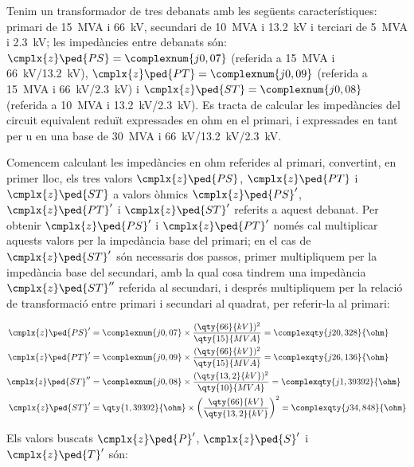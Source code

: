 	
\begin{exemple}[\ImpCircEqTrafoTresDeb{}]
	\addcontentsxms{\ImpCircEqTrafoTresDeb}
    Tenim un transformador de tres debanats amb les següents característiques: primari de \qty{15}{MVA} i \qty{66}{kV}, secundari de \qty{10}{MVA} i \qty{13,2}{kV} i terciari de \qty{5}{MVA} i \qty{2,3}{kV}; les impedàncies entre debanats són: $\cmplx{z}\ped{PS} = \complexnum{j 0,07}$ (referida a \qty{15}{MVA} i \qty{66}{kV}/\qty{13,2}{kV}), $\cmplx{z}\ped{PT} = \complexnum{j 0,09}$ (referida a \qty{15}{MVA} i \qty{66}{kV}/\qty{2,3}{kV}) i $\cmplx{z}\ped{ST} = \complexnum{j 0,08}$ (referida a \qty{10}{MVA} i \qty{13,2}{kV}/\qty{2,3}{kV}).  Es tracta de calcular les impedàncies del circuit equivalent reduït expressades en ohm en el primari, i expressades en tant per u en una base de \qty{30}{MVA} i \qty{66}{kV}/\qty{13,2}{kV}/\qty{2,3}{kV}.

    Comencem calculant les impedàncies en ohm referides al primari, convertint, en primer lloc, els tres valors $\cmplx{z}\ped{PS}$, $\cmplx{z}\ped{PT}$ i $\cmplx{z}\ped{ST}$ a valors òhmics $\cmplx{z}\ped{PS}'$, $\cmplx{z}\ped{PT}'$ i $\cmplx{z}\ped{ST}'$ referits a aquest debanat. Per obtenir $\cmplx{z}\ped{PS}'$ i $\cmplx{z}\ped{PT}'$ només cal multiplicar aquests valors per la impedància base del primari; en el cas de $\cmplx{z}\ped{ST}'$ són necessaris dos passos, primer multipliquem per la impedància base del secundari, amb la qual cosa tindrem una impedància $\cmplx{z}\ped{ST}''$ referida al secundari,  i després multipliquem per la relació de transformació entre primari i secundari al quadrat, per  referir-la al primari:

    \begin{align*}
        \cmplx{z}\ped{PS}' &=  \complexnum{j 0,07} \times \frac{(\qty{66}{kV})^2}{\qty{15}{MVA}} = \complexqty{j 20,328}{\ohm}\\
        \cmplx{z}\ped{PT}' &=  \complexnum{j 0,09} \times \frac{(\qty{66}{kV})^2}{\qty{15}{MVA}} = \complexqty{j 26,136}{\ohm}\\
        \cmplx{z}\ped{ST}'' &= \complexnum{j 0,08} \times \frac{(\qty{13,2}{kV})^2}{\qty{10}{MVA}} = \complexqty{j 1,39392}{\ohm}\\
        \cmplx{z}\ped{ST}' &=  \qty{1,39392}{\ohm} \times {\left(\frac{\qty{66}{kV}}{\qty{13,2}{kV}}\right)}^2 = \complexqty{j 34,848}{\ohm}
    \end{align*}

    Els valors buscats $\cmplx{z}\ped{P}'$, $\cmplx{z}\ped{S}'$ i $\cmplx{z}\ped{T}'$ són:


\end{exemple}
